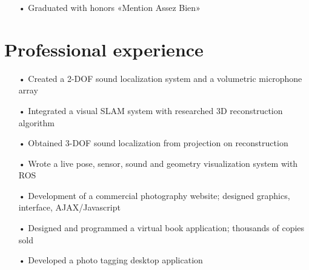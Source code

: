 \documentclass{cv}
\begin{document}
		\vspace{0.2\baselineskip} %

		\begin{position}[title={Bachelor's degree in Computer Science},
		                 institution={Université de Nice Sophia-Antipolis},
		                 country=France,
		                 from=2003,
		                 to=2004]
			\vspace{-\baselineskip} %
			\begin{itemize}
				\item[•] Graduated with honors «Mention Assez Bien»
			\end{itemize}
		\end{position}

	\vspace{-0.5\baselineskip} %

	\section{Professional experience}
		\begin{position}[title={Internship},
		                 institution={Honda Research Institute},
		                 country=Japan,
		                 from=August,
		                 to={October 2011}]
			\vspace{-\baselineskip} %
			\begin{itemize}
				\item[•] Created a 2-DOF sound localization system and a volumetric microphone array
				\item[•] Integrated a visual SLAM system with researched 3D reconstruction algorithm
				\item[•] Obtained 3-DOF sound localization from projection on reconstruction
				\item[•] Wrote a live pose, sensor, sound and geometry visualization system with ROS
			\end{itemize}
		\end{position}

		\vspace{0.2\baselineskip} %

		\begin{position}[title={Software development for www.f1-photo.com},
		                 institution={The Cahier Archive},
		                 country=France,
		                 from=2003,
		                 to=present]
			\vspace{-\baselineskip} %
			\begin{itemize}
				\item[•] Development of a commercial photography website; designed graphics, interface, AJAX/Javascript
				\item[•] Designed and programmed a virtual book application; thousands of copies sold
				\item[•] Developed a photo tagging desktop application
			\end{itemize}
		\end{position}
\end{document}
